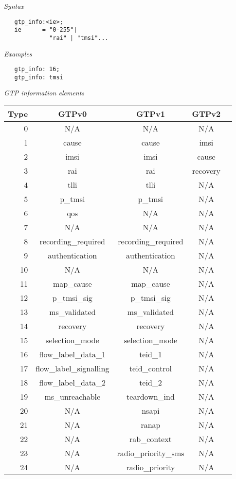 \documentclass[english]{report}
\begin{document}
\begin{itemize}
\textit{Syntax}
\footnotesize
\begin{verbatim}
   gtp_info:<ie>;
   ie      = "0-255"|
             "rai" | "tmsi"...
\end{verbatim}
\normalsize
\textit{Examples}
\footnotesize
\begin{verbatim}
   gtp_info: 16;
   gtp_info: tmsi
\end{verbatim}
\normalsize
\textit{GTP information elements}
\small
\begin{longtable}{|r|c|c|c|p{13.5cm}|}
\hline
Type & GTPv0 & GTPv1 & GTPv2\\
\hline
0 & N/A & N/A & N/A \\
\hline
1 & cause & cause & imsi\\
\hline
2 & imsi & imsi & cause \\
\hline
3 & rai & rai & recovery\\
\hline
4 & tlli & tlli & N/A\\
\hline
5 & p\_tmsi & p\_tmsi & N/A\\
\hline
6 & qos & N/A & N/A\\
\hline
7 & N/A & N/A & N/A \\
\hline
8 & recording\_required & recording\_required & N/A\\
\hline
9 & authentication & authentication & N/A\\
\hline
10 & N/A & N/A & N/A\\
\hline
11 & map\_cause & map\_cause & N/A\\
\hline
12 & p\_tmsi\_sig & p\_tmsi\_sig & N/A\\
\hline
13 & ms\_validated & ms\_validated & N/A\\
\hline
14 & recovery & recovery & N/A\\
\hline
15 & selection\_mode & selection\_mode & N/A\\
\hline
16 & flow\_label\_data\_1 & teid\_1 & N/A\\
\hline
17 & flow\_label\_signalling & teid\_control & N/A\\
\hline
18 & flow\_label\_data\_2 & teid\_2 & N/A\\
\hline
19 & ms\_unreachable & teardown\_ind & N/A\\
\hline
20 & N/A & nsapi & N/A\\
\hline
21 & N/A & ranap & N/A\\
\hline
22 & N/A & rab\_context & N/A\\
\hline
23 & N/A & radio\_priority\_sms & N/A\\
\hline
24 & N/A & radio\_priority & N/A\\

\end{longtable}
\end{itemize}
\end{document}
